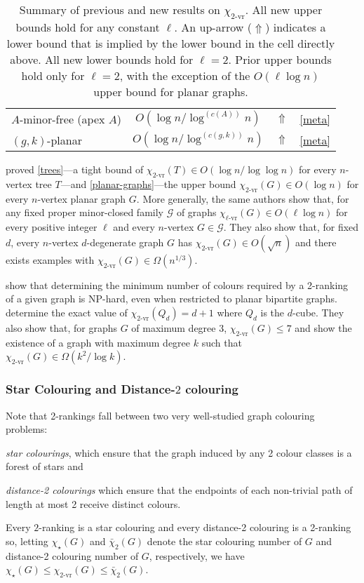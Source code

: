 \documentclass[kpfonts]{patmorin}
\newcommand{\defin}[1]{\emph{\color{brightmaroon}#1}}
\newcommand{\rn}[1]{\chi_{\operatorname{#1-vr}}}
\newcommand{\trn}{\rn{2}}
\newcommand{\lrn}{\rn{\ell}}
\newcommand{\dtcn}{\bar{\chi}_2}
\newcommand{\scn}{\chi_{\star}}
\theoremstyle{named}
\begin{document}
\begin{table}
{\begin{tabular}{|l|c|c|l|}
            $A$-minor-free (apex $A$) & $O(\log n/\log^{(c(A))} n)$ & $\Uparrow$ & \cref{meta} \\
            $(g,k)$-planar & $O(\log n/\log^{(c(g,k))} n)$ & $\Uparrow$  & \cref{meta} \\
            \hline
        \end{tabular}
    } %
    \caption{Summary of previous and new results on $\trn$.  All new upper bounds hold for any constant $\ell$. An up-arrow ($\Uparrow$) indicates a lower bound that is implied by the lower bound in the cell directly above. All new lower bounds hold for $\ell=2$. Prior upper bounds hold only for $\ell=2$, with the exception of the $O(\ell\log n)$ upper bound for planar graphs.}
\label{summary-table}
\end{table}

\citet{karpas.neiman.ea:on} proved \cref{trees}---a tight bound of $\trn(T)\in O(\log n/\log\log n)$ for every $n$-vertex tree $T$---and \cref{planar-graphs}---the upper bound $\trn(G)\in O(\log n)$ for every $n$-vertex planar graph $G$.  More generally, the same authors show that, for any fixed proper minor-closed family $\mathcal{G}$ of graphs $\lrn(G)\in O(\ell\log n)$ for every positive integer $\ell$ and every $n$-vertex $G\in\mathcal{G}$.  They also show that, for fixed $d$, every $n$-vertex $d$-degenerate graph $G$ has $\trn(G)\in O(\sqrt{n})$ and there exists examples with $\trn(G)\in\Omega(n^{1/3})$.

\citet{shalu.antony:complexity} show that determining the minimum number of colours required by a 2-ranking of a given graph is NP-hard, even when restricted to planar bipartite graphs.  \citet{almeter.demircan.ea:graph} determine the exact value of $\trn(Q_d)=d+1$ where $Q_d$ is the $d$-cube.  They also show that, for graphs $G$ of maximum degree 3, $\trn(G)\le 7$ and show the existence of a graph with maximum degree $k$ such that $\trn(G)\in\Omega(k^2/\log k)$.

\subsubsection{Star Colouring and Distance-$2$ colouring}

 Note that 2-rankings fall between two very well-studied graph colouring problems:
\begin{compactitem}
    \item \defin{star colourings}, which ensure that the graph induced by any 2 colour classes is a forest of stars and
    \item \defin{distance-2 colourings} which ensure that the endpoints of each non-trivial path of length at most 2 receive distinct colours.
\end{compactitem}
Every $2$-ranking is a star colouring and every distance-2 colouring is a 2-ranking so, letting $\scn(G)$ and $\dtcn(G)$ denote the star colouring number of $G$ and distance-2 colouring number of $G$, respectively, we have $\scn(G) \le \trn(G)\le \dtcn(G)$.
\end{document}
